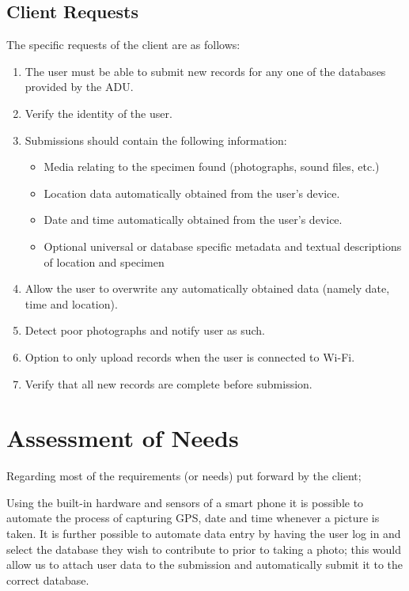 \documentclass[
10pt, %
a4paper, %
oneside, %
headinclude,footinclude, %
BCOR5mm, %
]{scrartcl}
\begin{document}
\subsection{Client Requests} %
\label{sub:client_requests}

The specific requests of the client are as follows:
\begin{enumerate}
\item The user must be able to submit new records for any one of the databases provided by the ADU.
\item Verify the identity of the user.
\item Submissions should contain the following information:
\begin{itemize}
  \item Media relating to the specimen found (photographs, sound files, etc.)
  \item Location data automatically obtained from the user's device.
  \item Date and time automatically obtained from the user's device.
  \item Optional universal or database specific metadata and textual descriptions of location and specimen
\end{itemize}
\item Allow the user to overwrite any automatically obtained data (namely date, time and location).
\item Detect poor photographs and notify user as such.
\item Option to only upload records when the user is connected to Wi-Fi.
\item Verify that all new records are complete before submission.
\end{enumerate}



\section{Assessment of Needs} %
\label{sec:assessment_of_needs}

Regarding most of the requirements (or needs) put forward by the client; 

\noindent
Using the built-in hardware and sensors of a smart phone it is possible to automate the process of capturing GPS, date and time whenever a picture is taken. It is further possible to automate data entry by having the user log in and select the database they wish to contribute to prior to taking a photo; this would allow us to attach user data to the submission and automatically submit it to the correct database. \\
\end{document}
